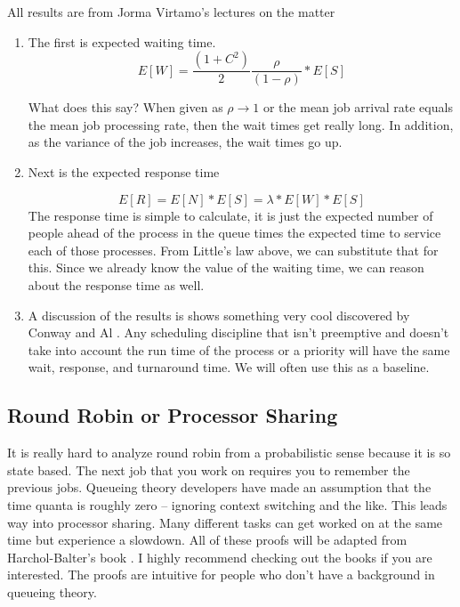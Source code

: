 All results are from Jorma Virtamo's lectures on the matter \cite{virtamo}

\begin{enumerate}
\item The first is expected waiting time.
  \[
  E[W] = \frac{(1 + C^2)}{2}\frac{\rho}{(1 - \rho)} * E[S]
  \]

  What does this say? When given as $\rho \rightarrow 1$ or the mean job arrival rate equals the mean job processing rate, then the wait times get really long.
  In addition, as the variance of the job increases, the wait times go up.

\item Next is the expected response time

  \[
  E[R] = E[N] * E[S] = \lambda * E[W] * E[S]
  \]
  The response time is simple to calculate, it is just the expected number of people ahead of the process in the queue times the expected time to service each of those processes.
  From Little's law above, we can substitute that for this. Since we already know the value of the waiting time, we can reason about the response time as well.
\item A discussion of the results is shows something very cool discovered by Conway and Al \cite{conway1967theory}.
  Any scheduling discipline that isn't preemptive and doesn't take into account the run time of the process or a priority will have the same wait, response, and turnaround time.
  We will often use this as a baseline.
\end{enumerate}

\subsection{Round Robin or Processor Sharing}

It is really hard to analyze round robin from a probabilistic sense because it is so state based.
The next job that you work on requires you to remember the previous jobs.
Queueing theory developers have made an assumption that the time quanta is roughly zero -- ignoring context switching and the like.
This leads way into processor sharing.
Many different tasks can get worked on at the same time but experience a slowdown.
All of these proofs will be adapted from Harchol-Balter's book \cite{harchol2013performance}.
I highly recommend checking out the books if you are interested.
The proofs are intuitive for people who don't have a background in queueing theory.

